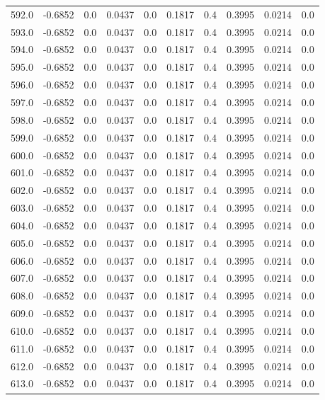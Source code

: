 \begin{longtable}{lrrrrrrrrr}
592.0 & -0.6852 & 0.0 & 0.0437 & 0.0 & 0.1817 & 0.4 & 0.3995 & 0.0214 & 0.0 \\
593.0 & -0.6852 & 0.0 & 0.0437 & 0.0 & 0.1817 & 0.4 & 0.3995 & 0.0214 & 0.0 \\
594.0 & -0.6852 & 0.0 & 0.0437 & 0.0 & 0.1817 & 0.4 & 0.3995 & 0.0214 & 0.0 \\
595.0 & -0.6852 & 0.0 & 0.0437 & 0.0 & 0.1817 & 0.4 & 0.3995 & 0.0214 & 0.0 \\
596.0 & -0.6852 & 0.0 & 0.0437 & 0.0 & 0.1817 & 0.4 & 0.3995 & 0.0214 & 0.0 \\
597.0 & -0.6852 & 0.0 & 0.0437 & 0.0 & 0.1817 & 0.4 & 0.3995 & 0.0214 & 0.0 \\
598.0 & -0.6852 & 0.0 & 0.0437 & 0.0 & 0.1817 & 0.4 & 0.3995 & 0.0214 & 0.0 \\
599.0 & -0.6852 & 0.0 & 0.0437 & 0.0 & 0.1817 & 0.4 & 0.3995 & 0.0214 & 0.0 \\
600.0 & -0.6852 & 0.0 & 0.0437 & 0.0 & 0.1817 & 0.4 & 0.3995 & 0.0214 & 0.0 \\
601.0 & -0.6852 & 0.0 & 0.0437 & 0.0 & 0.1817 & 0.4 & 0.3995 & 0.0214 & 0.0 \\
602.0 & -0.6852 & 0.0 & 0.0437 & 0.0 & 0.1817 & 0.4 & 0.3995 & 0.0214 & 0.0 \\
603.0 & -0.6852 & 0.0 & 0.0437 & 0.0 & 0.1817 & 0.4 & 0.3995 & 0.0214 & 0.0 \\
604.0 & -0.6852 & 0.0 & 0.0437 & 0.0 & 0.1817 & 0.4 & 0.3995 & 0.0214 & 0.0 \\
605.0 & -0.6852 & 0.0 & 0.0437 & 0.0 & 0.1817 & 0.4 & 0.3995 & 0.0214 & 0.0 \\
606.0 & -0.6852 & 0.0 & 0.0437 & 0.0 & 0.1817 & 0.4 & 0.3995 & 0.0214 & 0.0 \\
607.0 & -0.6852 & 0.0 & 0.0437 & 0.0 & 0.1817 & 0.4 & 0.3995 & 0.0214 & 0.0 \\
608.0 & -0.6852 & 0.0 & 0.0437 & 0.0 & 0.1817 & 0.4 & 0.3995 & 0.0214 & 0.0 \\
609.0 & -0.6852 & 0.0 & 0.0437 & 0.0 & 0.1817 & 0.4 & 0.3995 & 0.0214 & 0.0 \\
610.0 & -0.6852 & 0.0 & 0.0437 & 0.0 & 0.1817 & 0.4 & 0.3995 & 0.0214 & 0.0 \\
611.0 & -0.6852 & 0.0 & 0.0437 & 0.0 & 0.1817 & 0.4 & 0.3995 & 0.0214 & 0.0 \\
612.0 & -0.6852 & 0.0 & 0.0437 & 0.0 & 0.1817 & 0.4 & 0.3995 & 0.0214 & 0.0 \\
613.0 & -0.6852 & 0.0 & 0.0437 & 0.0 & 0.1817 & 0.4 & 0.3995 & 0.0214 & 0.0 \\

\end{longtable}
